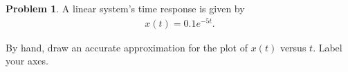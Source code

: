 \documentclass[10pt]{article}
\theoremstyle{definition}
\newtheorem{prob}{Problem}[section]
\newenvironment{subprob}%
{\renewcommand{\theenumi}{\alph{enumi}}\renewcommand{\labelenumi}{(\theenumi)}\begin{enumerate}}%
{\end{enumerate}}%
\begin{document}
                

                




\begin{prob}
    A linear system's time response is given by
    \begin{align*}
        x(t) = 0.1 e^{-5t} .
    \end{align*}

    By hand, draw an accurate approximation for the plot of \( x(t) \) versus \( t \).
    Label your axes.
\end{prob}

\clearpage\newpage
\end{document}
